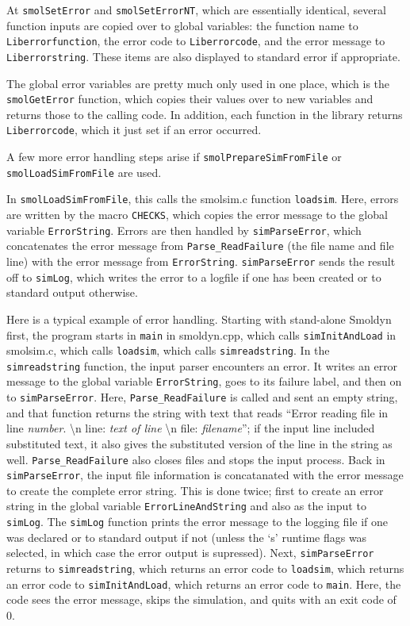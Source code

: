 \documentclass {scrbook}
\newcommand {\ttt} {\texttt}
\begin{document}
At \ttt{smolSetError} and \ttt{smolSetErrorNT}, which are essentially identical, several function inputs are copied over to global variables: the function name to \ttt{Liberrorfunction}, the error code to \ttt{Liberrorcode}, and the error message to \ttt{Liberrorstring}. These items are also displayed to standard error if appropriate.

The global error variables are pretty much only used in one place, which is the \ttt{smolGetError} function, which copies their values over to new variables and returns those to the calling code. In addition, each function in the library returns \ttt{Liberrorcode}, which it just set if an error occurred.

A few more error handling steps arise if \ttt{smolPrepareSimFromFile} or \ttt{smolLoadSimFromFile} are used.

In \ttt{smolLoadSimFromFile}, this calls the smolsim.c function \ttt{loadsim}. Here, errors are written by the macro \ttt{CHECKS}, which copies the error message to the global variable \ttt{ErrorString}. Errors are then handled by \ttt{simParseError}, which concatenates the error message from \ttt{Parse\_ReadFailure} (the file name and file line) with the error message from \ttt{ErrorString}. \ttt{simParseError} sends the result off to \ttt{simLog}, which writes the error to a logfile if one has been created or to standard output otherwise.

Here is a typical example of error handling. Starting with stand-alone Smoldyn first, the program starts in \ttt{main} in smoldyn.cpp, which calls \ttt{simInitAndLoad} in smolsim.c, which calls \ttt{loadsim}, which calls \ttt{simreadstring}. In the \ttt{simreadstring} function, the input parser encounters an error. It writes an error message to the global variable \ttt{ErrorString}, goes to its failure label, and then on to \ttt{simParseError}. Here, \ttt{Parse\_ReadFailure} is called and sent an empty string, and that function returns the string with text that reads ``Error reading file in line \textit{number}. \textbackslash n line: \textit{text of line} \textbackslash n file: \textit{filename}''; if the input line included substituted text, it also gives the substituted version of the line in the string as well. \ttt{Parse\_ReadFailure} also closes files and stops the input process. Back in \ttt{simParseError}, the input file information is concatanated with the error message to create the complete error string. This is done twice; first to create an error string in the global variable \ttt{ErrorLineAndString} and also as the input to \ttt{simLog}. The \ttt{simLog} function prints the error message to the logging file if one was declared or to standard output if not (unless the `s' runtime flags was selected, in which case the error output is supressed). Next, \ttt{simParseError} returns to \ttt{simreadstring}, which returns an error code to \ttt{loadsim}, which returns an error code to \ttt{simInitAndLoad}, which returns an error code to \ttt{main}. Here, the code sees the error message, skips the simulation, and quits with an exit code of 0.
\end{document}
